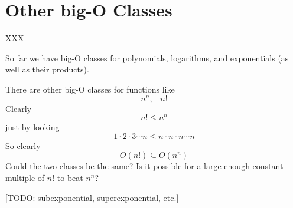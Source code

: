 \section{Other big-O Classes}

XXX

So far we have big-O classes for polynomials, logarithms, and 
exponentials (as well as their products).

There are other big-O classes for functions like
\[
n^n, \,\,\,\,\, n!
\]
Clearly
\[
n! \leq n^n
\]
just by looking
\[
1 \cdot 2 \cdot 3 \cdots n \leq n \cdot n \cdot n \cdots n
\]
So clearly
\[
O(n!) \subseteq O(n^n)
\]
Could the two classes be the same?
Is it possible for a large enough constant multiple of $n!$
to beat $n^n$?

[TODO: subexponential, superexponential, etc.]
